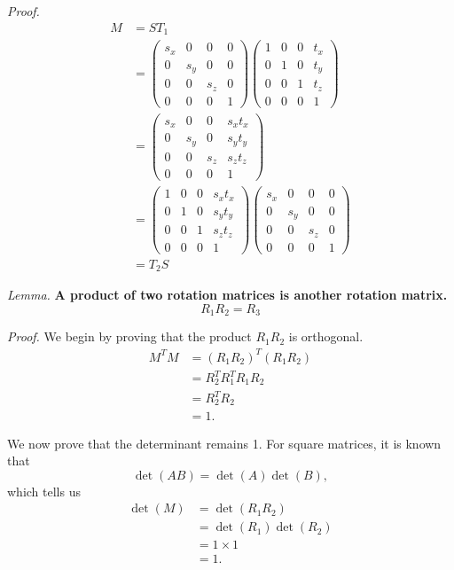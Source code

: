 \documentclass{article}
\begin{document}
\noindent\textit{Proof.}
\begin{align}
M &= ST_1 \\
&=
\begin{pmatrix}
s_x & 0 & 0 & 0\\
0 & s_y & 0 & 0\\
0 & 0 & s_z & 0\\
0 & 0 & 0 & 1
\end{pmatrix}
\begin{pmatrix}
1 & 0 & 0 & t_x\\
0 & 1 & 0 & t_y\\
0 & 0 & 1 & t_z\\
0 & 0 & 0 & 1
\end{pmatrix}\\
&=
\begin{pmatrix}
s_x & 0 & 0 & s_x t_x\\
0 & s_y & 0 & s_y t_y\\
0 & 0 & s_z & s_z t_z\\
0 & 0 & 0 & 1
\end{pmatrix}\\
&=
\begin{pmatrix}
1 & 0 & 0 & s_x t_x\\
0 & 1 & 0 & s_y t_y\\
0 & 0 & 1 & s_z t_z\\
0 & 0 & 0 & 1
\end{pmatrix}
\begin{pmatrix}
s_x & 0 & 0 & 0\\
0 & s_y & 0 & 0\\
0 & 0 & s_z & 0\\
0 & 0 & 0 & 1
\end{pmatrix}\\
&= T_2 S
\end{align}

\noindent
\textit{Lemma.}\textbf{ A product of two rotation matrices is another rotation matrix.}
\begin{equation}
R_1 R_2 = R_3
\end{equation}

\noindent\textit{Proof.}
We begin by proving that the product $R_1 R_2$ is orthogonal.
\begin{align}
M^T M &= (R_1 R_2)^T (R_1 R_2)\\
 &= R_2^T R_1^T R_1 R_2\\
 &= R_2^T R_2\\
 &= 1.
\end{align}

We now prove that the determinant remains 1. For square matrices, it is known that
\begin{equation}
\det(AB) = \det(A)\det(B),
\end{equation}
which tells us
\begin{align}
\det(M) &= \det(R_1 R_2)\\
 &= \det(R_1)\det(R_2)\\
 &= 1 \times 1\\
 &= 1.
\end{align}
\end{document}

